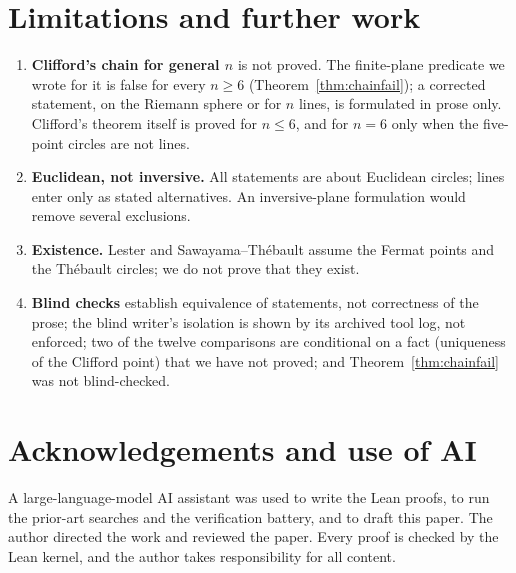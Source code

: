 \documentclass[11pt]{article}
\theoremstyle{definition}
\theoremstyle{remark}
\begin{document}
\section{Limitations and further work}\label{sec:limits}
\begin{enumerate}
\item \textbf{Clifford's chain for general $n$} is not proved. The finite-plane predicate we wrote for it
is false for every $n\ge6$ (Theorem~\ref{thm:chainfail}); a corrected statement, on the Riemann sphere
or for $n$ lines, is formulated in prose only. Clifford's theorem itself is proved for $n\le6$, and for
$n=6$ only when the five-point circles are not lines.
\item \textbf{Euclidean, not inversive.} All statements are about Euclidean circles; lines enter only
as stated alternatives. An inversive-plane formulation would remove several exclusions.
\item \textbf{Existence.} Lester and Sawayama--Th\'ebault assume the Fermat points and the Th\'ebault
circles; we do not prove that they exist.
\item \textbf{Blind checks} establish equivalence of statements, not correctness of the prose; the
blind writer's isolation is shown by its archived tool log, not enforced; two of the twelve comparisons are
conditional on a fact (uniqueness of the Clifford point) that we have not proved; and
Theorem~\ref{thm:chainfail} was not blind-checked.
\end{enumerate}

\section*{Acknowledgements and use of AI}
A large-language-model AI assistant was used to write the Lean proofs, to run the prior-art searches
and the verification battery, and to draft this paper. The author directed the work and reviewed the
paper. Every proof is checked by the Lean kernel, and the author takes responsibility for all content.
\end{document}
